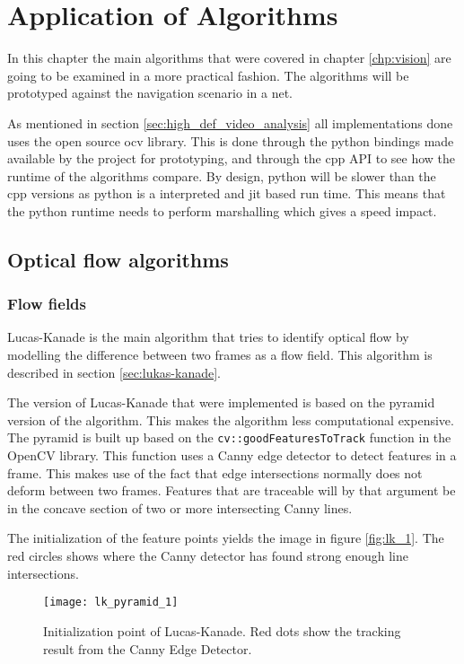 
\chapter{Application of Algorithms}
In this chapter the main algorithms that were covered in chapter \ref{chp:vision} are going to 
be examined in a more practical fashion. The algorithms will 
be prototyped against the navigation scenario in a net.

As mentioned in section \vref{sec:high_def_video_analysis} all implementations done uses the open source \gls{ocv} library. This is done 
through the \gls{python} bindings made available by the project for prototyping, and through the \gls{cpp} API to see how 
the runtime of the algorithms compare. By design, \gls{python} will be slower than the \gls{cpp} versions as \gls{python} is a 
interpreted and \gls{jit} based run time. This means that the \gls{python} runtime needs to perform \gls{marshalling} which 
gives a speed impact.

\section{Optical flow algorithms}

\subsection{Flow fields}
Lucas-Kanade is the main algorithm that tries to identify optical flow by modelling the difference between two frames as a flow field. This algorithm 
is described in section \vref{sec:lukas-kanade}. 

The version of Lucas-Kanade that were implemented is based on the pyramid version of the algorithm. This makes the 
algorithm less computational expensive. The pyramid is built up based on the \verb|cv::goodFeaturesToTrack| function in the OpenCV library. 
This function uses a Canny edge detector to detect features in a frame. This makes use of the fact that edge intersections 
normally does not deform between two frames. Features that are traceable will by that argument be in the 
concave section of two or more intersecting Canny lines.

The initialization of the feature points yields the image in figure \vref{fig:lk_1}. The red circles shows 
where the Canny detector has found strong enough line intersections.

\begin{figure}[htbp]
	\centering
	\texttt{[image: lk\_pyramid\_1]}
	\caption{Initialization point of Lucas-Kanade. Red dots show the tracking result from the Canny Edge Detector.}
	\label{fig:lk_1}
\end{figure}

